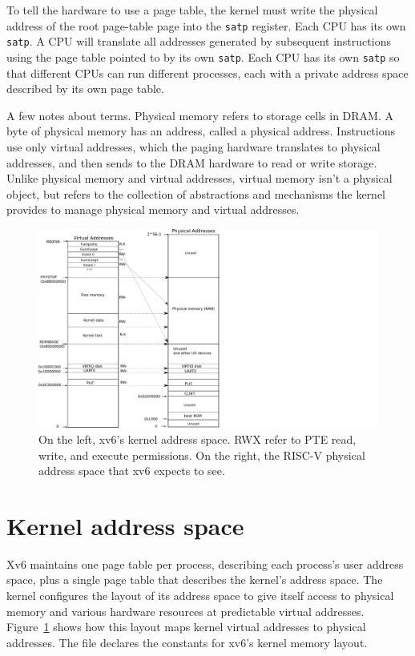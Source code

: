 To tell the hardware to use a page table, the kernel must
write the physical address of the root page-table page into the 
\texttt{satp} register.
Each CPU has its own
\texttt{satp}.
A CPU will translate all addresses generated by subsequent instructions
using the page table pointed to by its own \texttt{satp}.
Each CPU has its own \texttt{satp} so that different CPUs can run
different processes, each with a private address space described by
its own page table.

A few notes about terms.
Physical memory refers to storage cells in DRAM.
A byte of physical memory has an address, called a physical address.
Instructions use only virtual addresses, which the
paging hardware translates to physical addresses, and then
sends to the DRAM hardware to read or write storage.
Unlike physical memory and virtual addresses, virtual memory isn't a physical object, but refers to the collection of abstractions and mechanisms
the kernel provides to manage physical memory and virtual
addresses.

\begin{figure}[h]
\centering
 \includegraphics[scale=0.65]{fig/xv6_layout.pdf}
\caption{On the left, xv6's kernel address space.
{\sf \small{RWX}}
refer to PTE read, write, and execute permissions.
On the right, the RISC-V physical address space that
xv6 expects to see.}
\label{fig:xv6_layout}
\end{figure}

\section{Kernel address space}
Xv6 maintains one page table per process, describing each
process's user address space, plus a single page table
that describes the kernel's address space.
The kernel configures the layout of its address space to
give itself
access to physical memory and
various hardware resources at predictable virtual addresses.
Figure~\ref{fig:xv6_layout}
shows how this layout maps
kernel virtual addresses to physical addresses.  The file
declares the constants for xv6's kernel memory layout.

